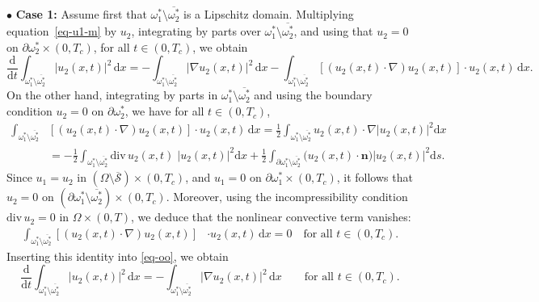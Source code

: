 \documentclass[a4paper,12pt,reqno,natbib]{amsart}
\newcommand{\dx} {\displaystyle\mathrm{d}x}
\newcommand{\ds} {\displaystyle\mathrm{d}s}
\begin{document}
\noindent$\bullet$ \textbf{Case 1:} Assume first that \( \omega_1^* \setminus \overline{\omega_2^*} \) is a Lipschitz domain. 
Multiplying equation~\eqref{eq-u1-m} by \( u_2 \), integrating by parts over \( \omega_1^* \setminus \overline{\omega_2^*} \), and using that \( u_2 = 0 \) on \( \partial \omega_2^*\times(0,T_c) \), for all  $t \in (0, T_c)$, we obtain
\begin{equation}\label{eq-oo}
\frac{\mathrm{d}}{\mathrm{d}t} \int_{\omega_1^* \setminus \overline{\omega_2^*}} |u_2(x, t)|^2 \, \dx = -\int_{\omega_1^* \setminus \overline{\omega_2^*}} |\nabla u_2(x, t)|^2 \, \dx -\int_{\omega_1^* \setminus \overline{\omega_2^*}} \left[ (u_2(x, t) \cdot \nabla) u_2(x, t) \right] \cdot u_2(x, t)\, \dx.
\end{equation}
On the other hand, integrating by parts in \( \omega_1^* \setminus \overline{\omega_2^*} \) and using the boundary condition \( u_2 = 0 \) on \( \partial \omega_2^* \), we have for all \( t \in (0, T_c) \),
\begin{align*} \int_{\omega_1^* \setminus \overline{\omega_2^*}} &\left[ (u_2(x, t) \cdot \nabla)u_2(x, t) \right] \cdot u_2(x, t)\, \dx=\frac{1}{2}\int_{\omega_1^* \setminus \overline{\omega_2^*}} u_2(x, t)\cdot\nabla \big|u_2(x, t)\big|^2\dx\\ 
&= -\frac{1}{2}\int_{\omega_1^* \setminus \overline{\omega_2^*}} \text{div}\, u_2(x, t)\; \big|u_2(x, t)\big|^2 \dx+ \frac{1}{2}\int_{{\partial\omega_1^* \setminus \overline{\omega_2^*}}} \big(u_2(x, t)\cdot\textbf{n}\big) \big|u_2(x, t)\big|^2 \ds.
\end{align*}
Since \( u_1 = u_2 \) in \( (\Omega \setminus \overline{\mathcal{S}}) \times (0, T_c) \), and \( u_1 = 0 \) on \( \partial \omega_1^*\times (0, T_c) \), it follows that \( u_2 = 0 \) on \( (\partial\omega_1^* \setminus \overline{\omega_2^*})\times (0, T_c) \). Moreover, using the incompressibility condition \( \text{div}\, u_2 = 0 \) in \( \Omega \times (0, T) \), we deduce that the nonlinear convective term vanishes:
\begin{align} \label{just}  \int_{\omega_1^* \setminus \overline{\omega_2^*}} \left[ (u_2(x, t) \cdot \nabla) u_2(x, t) \right] &\cdot u_2(x, t)\, \dx=0\quad\text{for all } t\in(0,T_c).
\end{align}
Inserting this identity into \eqref{eq-oo}, we obtain
\begin{equation}\label{eq-oo002}
\frac{\mathrm{d}}{\mathrm{d}t} \int_{\omega_1^* \setminus \overline{\omega_2^*}} |u_2(x, t)|^2 \, \dx = -\int_{\omega_1^* \setminus \overline{\omega_2^*}} |\nabla u_2(x, t)|^2 \, \dx \qquad \text{for all } t \in (0, T_c).
\end{equation}
\end{document}
